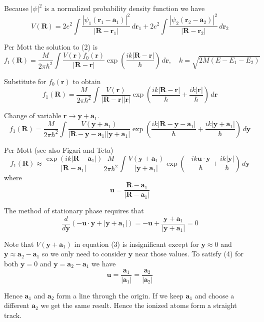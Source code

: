 \documentclass[12pt]{article}
\begin{document}
Because $|\psi|^2$ is a normalized probability density function we have
\begin{equation*}
V(\mathbf R)
=2e^2\int\frac{|\psi_1(\mathbf r_1-\mathbf a_1)|^2}{|\mathbf R-\mathbf r_1|}
\,d\mathbf r_1
+2e^2\int\frac{|\psi_2(\mathbf r_2-\mathbf a_2)|^2}{|\mathbf R-\mathbf r_2|}
\,d\mathbf r_2
\end{equation*}

Per Mott the solution to (2) is
\begin{equation*}
f_1(\mathbf R)=
\frac{M}{2\pi\hbar^2}\int\frac{V(\mathbf r)f_0(\mathbf r)}{|\mathbf R-\mathbf r|}
\exp\left(\frac{ik|\mathbf R-\mathbf r|}{\hbar}\right)\,d\mathbf r,
\quad
k=\sqrt{2M(E-E_1-E_2)}
\end{equation*}

Substitute for $f_0(\mathbf r)$ to obtain
\begin{equation*}
f_1(\mathbf R)=
\frac{M}{2\pi\hbar^2}\int\frac{V(\mathbf r)}{|\mathbf R-\mathbf r||\mathbf r|}
\exp\left(\frac{ik|\mathbf R-\mathbf r|}{\hbar}+\frac{ik|\mathbf r|}{\hbar}\right)\,d\mathbf r
\end{equation*}

Change of variable $\mathbf r\rightarrow\mathbf y+\mathbf a_1$.
\begin{equation*}
f_1(\mathbf R)=
\frac{M}{2\pi\hbar^2}\int
\frac{V(\mathbf y+\mathbf a_1)}{|\mathbf R-\mathbf y-\mathbf a_1||\mathbf y+\mathbf a_1|}
\exp\left(\frac{ik|\mathbf R-\mathbf y-\mathbf a_1|}{\hbar}
+\frac{ik|\mathbf y+\mathbf a_1|}{\hbar}\right)\,d\mathbf y
\end{equation*}

Per Mott (see also Figari and Teta)
\begin{equation*}
f_1(\mathbf R)\approx
\frac{\exp(ik|\mathbf R-\mathbf a_1|)}{|\mathbf R-\mathbf a_1|}
\frac{M}{2\pi\hbar^2}\int\frac{V(\mathbf y+\mathbf a_1)}{|\mathbf y+\mathbf a_1|}
\exp\left(-\frac{ik\mathbf u\cdot\mathbf y}{\hbar}+\frac{ik|\mathbf y|}{\hbar}\right)\,d\mathbf y
\tag{3}
\end{equation*}
where
\begin{equation*}
\mathbf u=\frac{\mathbf R-\mathbf a_1}{|\mathbf R-\mathbf a_1|}
\end{equation*}

The method of stationary phase requires that
\begin{equation*}
\frac{d}{d\mathbf y}\left(-\mathbf u\cdot\mathbf y+|\mathbf y+\mathbf a_1|\right)
=-\mathbf u+\frac{\mathbf y+\mathbf a_1}{|\mathbf y+\mathbf a_1|}=0
\tag{4}
\end{equation*}

Note that $V(\mathbf y+\mathbf a_1)$ in equation (3) is insignificant
except for $\mathbf y\approx0$ and $\mathbf y\approx\mathbf a_2-\mathbf a_1$ so we only need to consider
$\mathbf y$ near those values.
To satisfy (4) for both $\mathbf y=0$ and $\mathbf y=\mathbf a_2-\mathbf a_1$ we have
\begin{equation*}
\mathbf u=\frac{\mathbf a_1}{|\mathbf a_1|}=\frac{\mathbf a_2}{|\mathbf a_2|}
\end{equation*}

Hence $\mathbf a_1$ and $\mathbf a_2$ form a line through the origin.
If we keep $\mathbf a_1$ and choose a different $\mathbf a_2$ we get the same result.
Hence the ionized atoms form a straight track.
\end{document}
